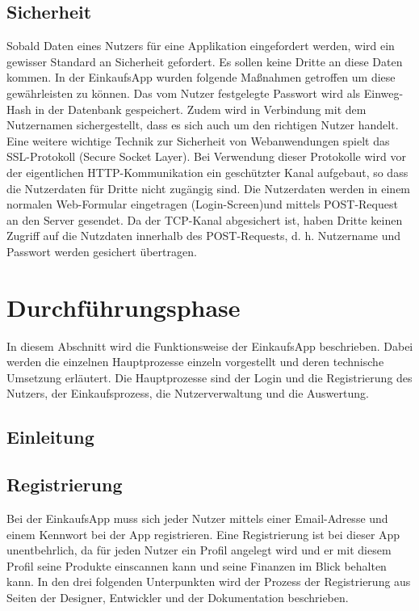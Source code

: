 \documentclass[12pt,a4paper]{article}
\begin{document}
\subsection{Sicherheit}
Sobald Daten eines Nutzers für eine Applikation eingefordert werden, wird ein gewisser Standard an Sicherheit gefordert. Es sollen keine Dritte an diese Daten kommen.
In der EinkaufsApp wurden folgende Maßnahmen getroffen um diese gewährleisten zu können.
Das vom Nutzer festgelegte Passwort wird als Einweg-Hash in der Datenbank gespeichert. Zudem wird in Verbindung mit dem Nutzernamen sichergestellt, dass es sich auch um den richtigen Nutzer handelt. Eine weitere wichtige Technik zur Sicherheit von Webanwendungen spielt das SSL-Protokoll (Secure Socket Layer). Bei Verwendung dieser Protokolle wird vor der eigentlichen HTTP-Kommunikation ein geschützter Kanal aufgebaut, so dass die Nutzerdaten für Dritte nicht zugängig sind. Die Nutzerdaten werden in einem normalen Web-Formular eingetragen (Login-Screen)und mittels POST-Request an den Server gesendet. Da der TCP-Kanal abgesichert ist, haben Dritte keinen Zugriff auf die Nutzdaten innerhalb des POST-Requests, d. h. Nutzername und Passwort werden gesichert übertragen. 
\newpage
\section{Durchführungsphase}
In diesem Abschnitt wird die Funktionsweise der EinkaufsApp beschrieben. Dabei werden die einzelnen Hauptprozesse einzeln vorgestellt und deren technische Umsetzung erläutert. Die Hauptprozesse sind der Login und die Registrierung des Nutzers, der Einkaufsprozess, die Nutzerverwaltung und die Auswertung. 
\subsection*{Einleitung}
\newpage
\subsection{Registrierung}
Bei der EinkaufsApp muss sich jeder Nutzer mittels einer Email-Adresse und einem Kennwort bei der App registrieren.
Eine Registrierung ist bei dieser App unentbehrlich, da für jeden Nutzer ein Profil angelegt wird und er mit diesem Profil seine Produkte einscannen kann und seine Finanzen im Blick behalten kann.
In den drei folgenden Unterpunkten wird der Prozess der Registrierung aus Seiten der Designer, Entwickler und der Dokumentation beschrieben.
\end{document}

